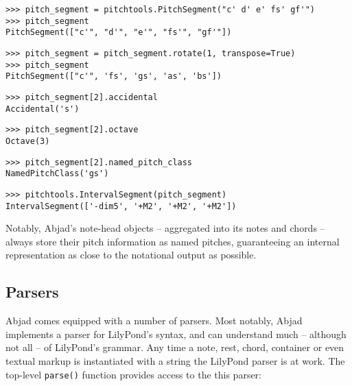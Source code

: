 \begin{abjadbookoutput}
\begin{singlespacing}
\vspace{-0.5\baselineskip}
\begin{verbatim}
>>> pitch_segment = pitchtools.PitchSegment("c' d' e' fs' gf'")
>>> pitch_segment
PitchSegment(["c'", "d'", "e'", "fs'", "gf'"])
\end{verbatim}
\begin{verbatim}
>>> pitch_segment = pitch_segment.rotate(1, transpose=True)
>>> pitch_segment
PitchSegment(["c'", 'fs', 'gs', 'as', 'bs'])
\end{verbatim}
\begin{verbatim}
>>> pitch_segment[2].accidental
Accidental('s')
\end{verbatim}
\begin{verbatim}
>>> pitch_segment[2].octave
Octave(3)
\end{verbatim}
\begin{verbatim}
>>> pitch_segment[2].named_pitch_class
NamedPitchClass('gs')
\end{verbatim}
\begin{verbatim}
>>> pitchtools.IntervalSegment(pitch_segment)
IntervalSegment(['-dim5', '+M2', '+M2', '+M2'])
\end{verbatim}
\end{singlespacing}
\end{abjadbookoutput}

\noindent Notably, Abjad's note-head objects -- aggregated into its notes and
chords -- always store their pitch information as named pitches, guaranteeing
an internal representation as close to the notational output as possible.

\subsection{Parsers}
\label{ssec:parsers}

Abjad comes equipped with a number of parsers. Most notably, Abjad implements a
parser for LilyPond's syntax, and can understand much -- although not all -- of
LilyPond's grammar. Any time a note, rest, chord, container or even textual
markup is instantiated with a string the LilyPond parser is at work. The
top-level \texttt{parse()} function provides access to the this parser:

\begin{comment}
<abjad>
string = r"\new Staff { c'4 ( \p \< d'4 e'4 f'4 ) \! }"
result = parse(string)
show(result)
</abjad>
\end{comment}

